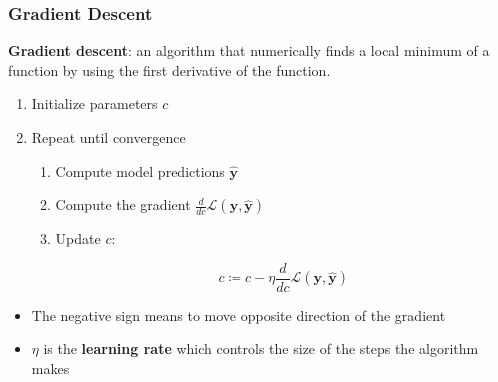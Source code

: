 \documentclass{beamer}
\begin{document}
\begin{frame}
\frametitle{Gradient Descent}

\textbf{Gradient descent}:  an algorithm that numerically finds \alert{a local minimum} of a function by using the first derivative of the function.

\hfill

\begin{enumerate}
\item Initialize parameters $c$
\item Repeat until convergence

\begin{enumerate}
\item Compute model predictions $\hat{\boldsymbol{y}}$
\item Compute the gradient $\frac{d}{dc}\mathcal{L}(\mathbf{y},\hat{\mathbf{y}})$
\item Update $c$:

\[
c \coloneqq c-\eta\frac{d}{dc}\mathcal{L}(\mathbf{y},\hat{\mathbf{y}})
\]

\end{enumerate}

\end{enumerate}

\begin{block}

\begin{itemize}
\item The negative sign means to move opposite direction of the gradient
\item $\eta$ is the \textbf{learning rate} which controls the size of the steps the algorithm makes
\end{itemize}

\end{block}

\end{frame}
\end{document}
